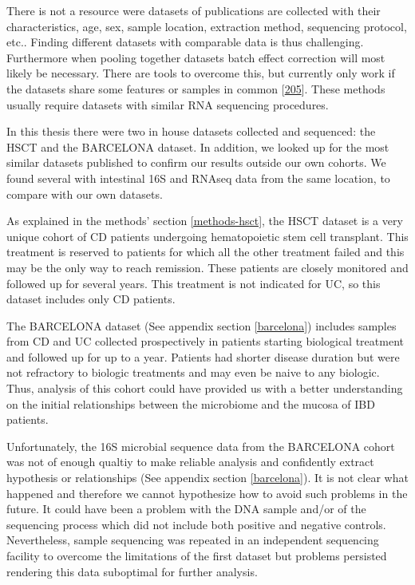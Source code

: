 \documentclass[
  12pt,
  a4paper,
  twoside,
  openright]{book}
\begin{document}
There is not a resource were datasets of publications are collected with their characteristics, age, sex, sample location, extraction method, sequencing protocol, etc..
Finding different datasets with comparable data is thus challenging.
Furthermore when pooling together datasets batch effect correction will most likely be necessary.
There are tools to overcome this, but currently only work if the datasets share some features or samples in common {[}\protect\hyperlink{ref-ugidos2020}{205}{]}.
These methods usually require datasets with similar RNA sequencing procedures.

In this thesis there were two in house datasets collected and sequenced: the HSCT and the BARCELONA dataset.
In addition, we looked up for the most similar datasets published to confirm our results outside our own cohorts.
We found several with intestinal 16S and RNAseq data from the same location, to compare with our own datasets.

As explained in the methods' section \ref{methods-hsct}, the HSCT dataset is a very unique cohort of CD patients undergoing hematopoietic stem cell transplant.
This treatment is reserved to patients for which all the other treatment failed and this may be the only way to reach remission.
These patients are closely monitored and followed up for several years.
This treatment is not indicated for UC, so this dataset includes only CD patients.

The BARCELONA dataset (See appendix section \ref{barcelona}) includes samples from CD and UC collected prospectively in patients starting biological treatment and followed up for up to a year.
Patients had shorter disease duration but were not refractory to biologic treatments and may even be naive to any biologic.
Thus, analysis of this cohort could have provided us with a better understanding on the initial relationships between the microbiome and the mucosa of IBD patients.

Unfortunately, the 16S microbial sequence data from the BARCELONA cohort was not of enough qualtiy to make reliable analysis and confidently extract hypothesis or relationships (See appendix section \ref{barcelona}).
It is not clear what happened and therefore we cannot hypothesize how to avoid such problems in the future.
It could have been a problem with the DNA sample and/or of the sequencing process which did not include both positive and negative controls.
Nevertheless, sample sequencing was repeated in an independent sequencing facility to overcome the limitations of the first dataset but problems persisted rendering this data suboptimal for further analysis.
\end{document}
